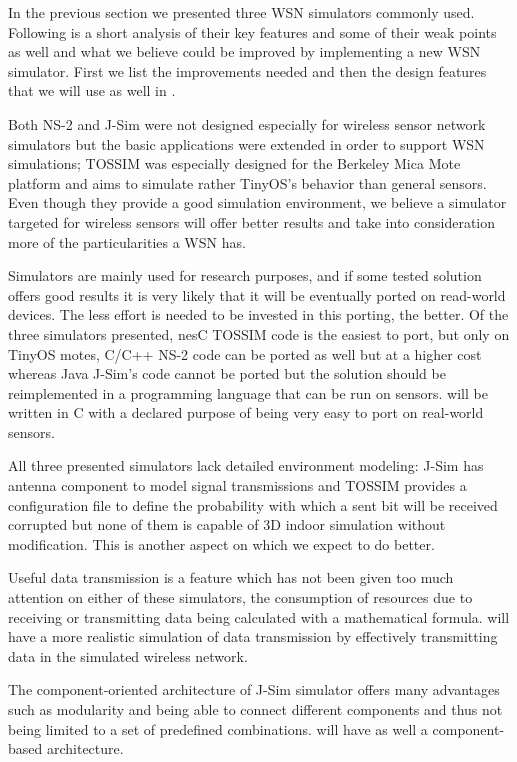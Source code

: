 In the previous section we presented three WSN simulators commonly used.
Following is a short analysis of their key features and some of their
weak points as well and what we believe could be improved by implementing a
new WSN simulator. First we list the improvements needed and then the 
design features that we will use as well in \codename. 

Both NS-2 and J-Sim were not designed especially for wireless 
sensor network simulators but the basic applications were extended
in order to support WSN simulations; TOSSIM was especially designed
for the Berkeley Mica Mote platform and aims to simulate rather TinyOS's behavior
than general sensors. Even though they provide a good simulation environment,
we believe a simulator targeted for wireless sensors will offer better results
and take into consideration more of the particularities a WSN has.

Simulators are mainly used for research purposes, and if some tested solution
offers good results it is very likely that it will be eventually ported on 
read-world devices. The less effort is needed to be invested in this porting, the
better. Of the three simulators presented, nesC TOSSIM code is the easiest to port,
but only on TinyOS motes, C/C++ NS-2 code can be ported as well but at a higher
cost whereas Java J-Sim's code cannot be ported but the solution should be 
reimplemented in a programming language that can be run on sensors.
\codename will be written in C with a declared purpose of being very easy to port
on real-world sensors.

All three presented simulators lack detailed environment modeling: J-Sim has 
antenna component to model signal transmissions and TOSSIM provides a configuration
file to define the probability with which a sent bit will be received corrupted but 
none of them is capable of 3D indoor simulation without modification. 
This is another aspect on which we expect \codename to do better. 

Useful data transmission is a feature which has not been given too much 
attention on either of these simulators, the consumption of resources due to
receiving or transmitting data being calculated with a mathematical formula.
 \codename will have a more realistic simulation of data transmission by effectively
transmitting data in the simulated wireless network.

The component-oriented architecture of J-Sim simulator offers many advantages
such as modularity and being able to connect different components and thus not being limited
to a set of predefined combinations. \codename will have as well a component-based
architecture.

